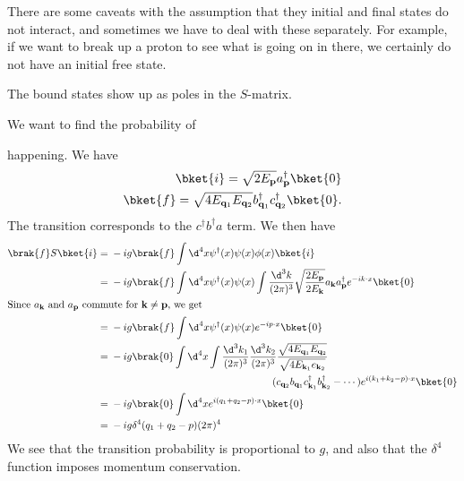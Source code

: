 \documentclass[a4paper]{article}
\begin{document}
There are some caveats with the assumption that they initial and final states do not interact, and sometimes we have to deal with these separately. For example, if we want to break up a proton to see what is going on in there, we certainly do not have an initial free state.

The bound states show up as poles in the $S$-matrix.

\begin{eg}
  We want to find the probability of
  \begin{center}
  \end{center}
  happening. We have
  \begin{align*}
    \bket{i} = \sqrt{2E_\mathbf{p}} a_\mathbf{p}^\dagger \bket{0}\\
    \bket{f} = \sqrt{4E_{\mathbf{q}_1} E_{\mathbf{q}_2}} b_{\mathbf{q}_1}^\dagger c_{\mathbf{q}_2}^{\dagger} \bket{0}.
  \end{align*}
  The transition corresponds to the $c^\dagger b^\dagger a$ term. We then have
  \begin{align*}
    \brak{f}S\bket{i} ={}& -ig \brak{f} \int \d^4 x \psi^\dagger(x) \psi(x) \phi(x)\bket{i}\\
    ={}& -ig \brak{f} \int \d^4 x \psi^\dagger(x) \psi(x) \int \frac{\d^3 k}{(2\pi)^3} \sqrt{\frac{2E_\mathbf{p}}{2 E_\mathbf{k}}}a_\mathbf{k}a_\mathbf{p}^\dagger e^{-ik\cdot x}\bket{0}\\
    \intertext{Since $a_\mathbf{k}$ and $a_\mathbf{p}$ commute for $\mathbf{k} \not= \mathbf{p}$, we get}
    ={}& -ig \brak{f} \int \d^4 x \psi^\dagger(x) \psi(x) e^{-ip\cdot x} \bket{0}\\
    ={}& -ig \brak{0} \int \d^4 x \int \frac{\d^3 k_1}{(2\pi)^3} \frac{\d^3 k_2}{(2\pi)^3} \frac{\sqrt{4E_{\mathbf{q}_1} E_{\mathbf{q}_2}}}{\sqrt{4 E_{\mathbf{k}_1} e_{\mathbf{k}_2}}}\\
    &\hphantom{-ig \brak{0} \int \d^4 x \int \frac{\d^3 k_1}{(2\pi)^3} \frac{\d^3 k_2}{(2\pi)^3}}( c_{\mathbf{q}_2} b_{\mathbf{q}_1} c_{\mathbf{k}_1}^\dagger b_{\mathbf{k}_2}^\dagger - \cdots) e^{i(k_1 + k_2 - p)\cdot x}\bket{0}\\
    ={}& -ig \brak{0} \int \d^4 x e^{i(q_1 + q_2 - p) \cdot x} \bket{0}\\
    ={}& -ig \delta^4 (q_1 + q_2 - p) (2\pi)^4
  \end{align*}
  We see that the transition probability is proportional to $g$, and also that the $\delta^4$ function imposes momentum conservation.
\end{eg}
\end{document}
